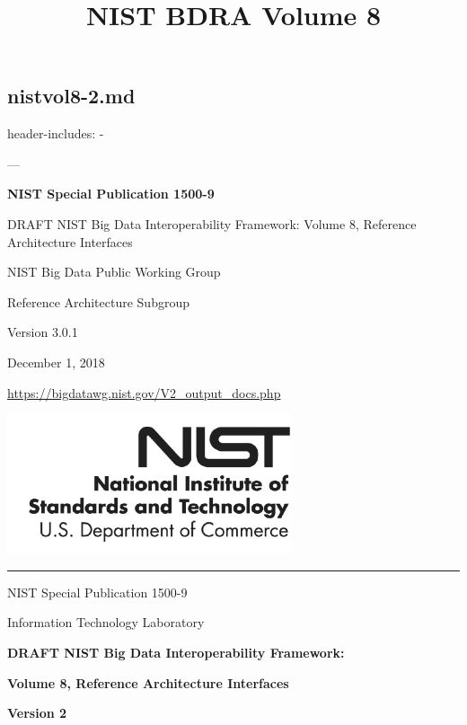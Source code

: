 \documentclass[9pt,]{article}
\title{NIST BDRA Volume 8}
\date{}
\newenvironment{Shaded}{}{}
\newcommand{\ExtensionTok}[1]{#1}
\newcommand{\NormalTok}[1]{#1}
\begin{document}
\maketitle

{
\setcounter{tocdepth}{3}
\tableofcontents
}
\hypertarget{nistvol8-2.md}{%
\subsection{nistvol8-2.md}\label{nistvol8-2.md}}

header-includes: - \usepackage[margins=raggedright]{floatrow} ---

\textbf{NIST Special Publication 1500-9}

\begin{Shaded}
\begin{Highlighting}[]
\ExtensionTok{DRAFT}\NormalTok{ NIST Big Data Interoperability Framework:}
\ExtensionTok{Volume}\NormalTok{ 8, Reference}
\ExtensionTok{Architecture}\NormalTok{ Interfaces}
\end{Highlighting}
\end{Shaded}

NIST Big Data Public Working Group

Reference Architecture Subgroup

Version 3.0.1

December 1, 2018

\url{https://bigdatawg.nist.gov/V2_output_docs.php}

\includegraphics{images/nist.png}

\begin{center}\rule{0.5\linewidth}{\linethickness}\end{center}

NIST Special Publication 1500-9

Information Technology Laboratory

\textbf{DRAFT NIST Big Data Interoperability Framework:}

\textbf{Volume 8, Reference Architecture Interfaces}

\textbf{Version 2}
\end{document}
